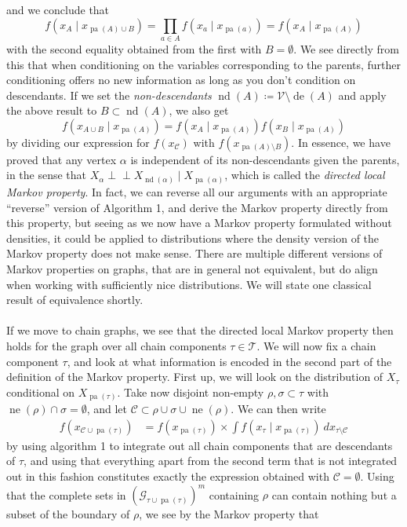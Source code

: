 \documentclass[11pt, a4paper]{memoir}
\theoremstyle{break}
\theoremstyle{break}
\theoremstyle{nonumberplain}
\newcommand{\indep}{\perp \!\!\! \perp}
\DeclareMathOperator{\pa}{pa}
\DeclareMathOperator{\de}{de}
\DeclareMathOperator{\nei}{ne}
\DeclareMathOperator{\nd}{nd}
\begin{document}
and we conclude that
$$f\left(x_{A}\mid x_{\pa(A)\cup B}\right)=\prod_{a\in A} f\left(x_{a}\mid x_{\pa(a)}\right)=f\left(x_A\mid x_{\pa(A)}\right)$$
with the second equality obtained from the first with $B=\emptyset$. We see directly from this that when conditioning on the variables corresponding to the parents, further conditioning offers no new information as long as you don't condition on descendants. If we set the \textit{non-descendants} $\nd(A)\coloneqq\mathcal{V}\setminus \de(A)$ and apply the above result to $B\subset \nd(A)$, we also get
$$f\left(x_{A\cup B}\mid x_{\pa(A)}\right)=f\left(x_A\mid x_{\pa(A)}\right)f\left(x_{B}\mid x_{\pa(A)}\right)$$
by dividing our expression for $f(x_\mathcal{C})$ with $f(x_{\pa(A)\setminus B})$. In essence, we have proved that any vertex $\alpha$ is independent of its non-descendants given the parents, in the sense that $X_\alpha\indep X_{\nd(\alpha)}\mid X_{\pa(\alpha)}$, which is called the \textit{directed local Markov property}. In fact, we can reverse all our arguments with an appropriate \enquote{reverse} version of Algorithm 1, and derive the Markov property directly from this property, but seeing as we now have a Markov property formulated without densities, it could be applied to distributions where the density version of the Markov property does not make sense. There are multiple different versions of Markov properties on graphs, that are in general not equivalent, but do align when working with sufficiently nice distributions. We will state one classical result of equivalence shortly.\\\\
If we move to chain graphs, we see that the directed local Markov property then holds for the graph over all chain components $\tau\in \mathscr{T}$. We will now fix a chain component $\tau$, and look at what information is encoded in the second part of the definition of the Markov property. First up, we will look on the distribution of $X_\tau$ conditional on $X_{\pa(\tau)}$. Take now disjoint non-empty $\rho,\sigma\subset \tau$ with $\nei(\rho)\cap \sigma=\emptyset$, and let $\mathcal{C}\subset \rho\cup\sigma\cup \nei(\rho)$. We can then write
\begin{align*}
f\left(x_{\mathcal{C}\cup\pa(\tau)}\right)&=f(x_{\pa(\tau)})\times \int f\left(x_\tau\mid x_{\pa(\tau)}\right)\ dx_{\tau\setminus \mathcal{C}}
\end{align*}
by using algorithm 1 to integrate out all chain components that are descendants of $\tau$, and using that everything apart from the second term that is not integrated out in this fashion constitutes exactly the expression obtained with $\mathcal{C}=\emptyset$. Using that the complete sets in $(\mathcal{G}_{\tau\cup\pa(\tau)})^{m}$ containing $\rho$ can contain nothing but a subset of  the boundary of $\rho$, we see by the Markov property that 
\end{document}
